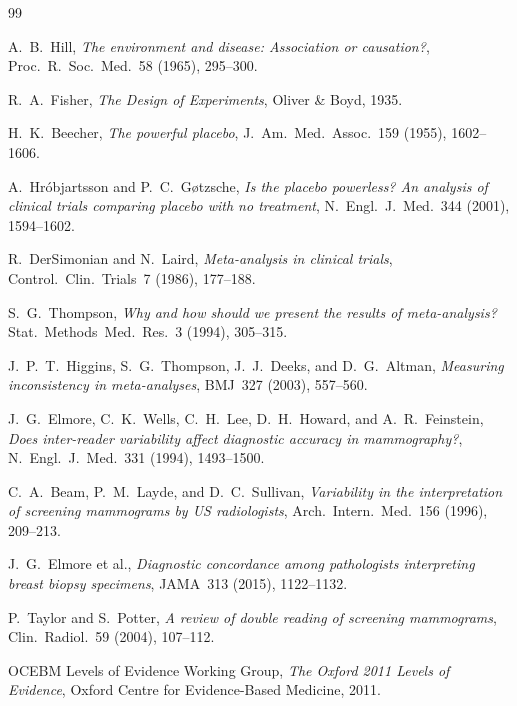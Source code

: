 \documentclass[12pt,a4paper]{article}
\theoremstyle{remark}
\begin{document}
\begin{thebibliography}{99}

A.~B.~Hill,
\emph{The environment and disease: Association or causation?},
Proc.~R.~Soc.~Med.~58 (1965), 295--300.

R.~A.~Fisher,
\emph{The Design of Experiments},
Oliver \& Boyd, 1935.

H.~K.~Beecher,
\emph{The powerful placebo},
J.~Am.~Med.~Assoc.~159 (1955), 1602--1606.

A.~Hr\'{o}bjartsson and P.~C.~G{\o}tzsche,
\emph{Is the placebo powerless? An analysis of clinical trials comparing
placebo with no treatment},
N.~Engl.~J.~Med.~344 (2001), 1594--1602.

R.~DerSimonian and N.~Laird,
\emph{Meta-analysis in clinical trials},
Control.~Clin.~Trials~7 (1986), 177--188.

S.~G.~Thompson,
\emph{Why and how should we present the results of meta-analysis?}
Stat.~Methods~Med.~Res.~3 (1994), 305--315.

J.~P.~T.~Higgins, S.~G.~Thompson, J.~J.~Deeks, and D.~G.~Altman,
\emph{Measuring inconsistency in meta-analyses},
BMJ~327 (2003), 557--560.

J.~G.~Elmore, C.~K.~Wells, C.~H.~Lee, D.~H.~Howard, and A.~R.~Feinstein,
\emph{Does inter-reader variability affect diagnostic accuracy in
mammography?},
N.~Engl.~J.~Med.~331 (1994), 1493--1500.

C.~A.~Beam, P.~M.~Layde, and D.~C.~Sullivan,
\emph{Variability in the interpretation of screening mammograms by US
radiologists},
Arch.~Intern.~Med.~156 (1996), 209--213.

J.~G.~Elmore et al.,
\emph{Diagnostic concordance among pathologists interpreting breast biopsy
specimens},
JAMA~313 (2015), 1122--1132.

P.~Taylor and S.~Potter,
\emph{A review of double reading of screening mammograms},
Clin.~Radiol.~59 (2004), 107--112.

OCEBM Levels of Evidence Working Group,
\emph{The Oxford 2011 Levels of Evidence},
Oxford Centre for Evidence-Based Medicine, 2011.


\end{thebibliography}
\end{document}
